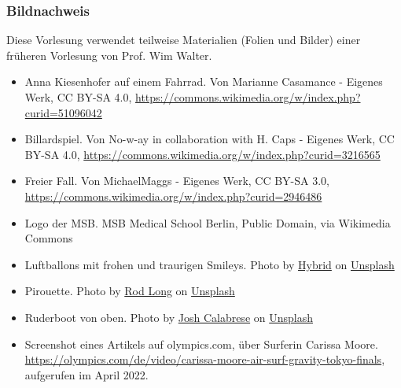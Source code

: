 \documentclass{beamer}
\begin{document}
\begin{frame}
\frametitle{Bildnachweis}
 
Diese Vorlesung verwendet teilweise Materialien (Folien und Bilder) einer früheren Vorlesung von Prof. Wim Walter.  

\vfill

\begin{tiny}
 
\begin{itemize}

\item
Anna Kiesenhofer auf einem Fahrrad. Von Marianne Casamance - Eigenes Werk, CC BY-SA 4.0, \url{https://commons.wikimedia.org/w/index.php?curid=51096042}

\item
Billardspiel. Von No-w-ay in collaboration with H. Caps - Eigenes Werk, CC BY-SA 4.0, \url{https://commons.wikimedia.org/w/index.php?curid=3216565}

\item
Freier Fall. Von MichaelMaggs - Eigenes Werk, CC BY-SA 3.0, \url{https://commons.wikimedia.org/w/index.php?curid=2946486}

\item
Logo der MSB. MSB Medical School Berlin, Public Domain, via Wikimedia Commons

\item
Luftballons mit frohen und traurigen Smileys. Photo by \href{https://unsplash.com/@artbyhybrid?utm_source=unsplash&utm_medium=referral&utm_content=creditCopyText}{Hybrid} on \href{https://unsplash.com/s/photos/feedback?utm_source=unsplash&utm_medium=referral&utm_content=creditCopyText}{Unsplash}
  
\item
Pirouette. Photo by \href{https://unsplash.com/@rodlong?utm_source=unsplash&utm_medium=referral&utm_content=creditCopyText}{Rod Long} on \href{https://unsplash.com/s/photos/figure-skater?utm_source=unsplash&utm_medium=referral&utm_content=creditCopyText}{Unsplash}  

\item
Ruderboot von oben. Photo by \href{https://unsplash.com/@joshcala?utm_source=unsplash&utm_medium=referral&utm_content=creditCopyText}{Josh Calabrese} on \href{https://unsplash.com/s/photos/rowing?utm_source=unsplash&utm_medium=referral&utm_content=creditCopyText}{Unsplash}
  

\item
Screenshot eines Artikels auf olympics.com, über Surferin Carissa Moore. \href{https://olympics.com/de/video/carissa-moore-air-surf-gravity-tokyo-finals}{https://olympics.com/de/video/carissa-moore-air-surf-gravity-tokyo-finals}, aufgerufen im April 2022.


\end{itemize}
\end{tiny}
\end{frame}
\end{document}
